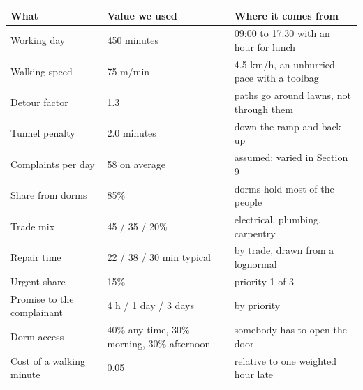 \begin{tabular}{llp{58mm}}
\toprule
\textbf{What} & \textbf{Value we used} & \textbf{Where it comes from} \\
\midrule
Working day & 450 minutes & 09:00 to 17:30 with an hour for lunch \\
Walking speed & 75 m/min & 4.5 km/h, an unhurried pace with a toolbag \\
Detour factor & 1.3 & paths go around lawns, not through them \\
Tunnel penalty & 2.0 minutes & down the ramp and back up \\
Complaints per day & 58 on average & assumed; varied in Section 9 \\
Share from dorms & 85\% & dorms hold most of the people \\
Trade mix & 45 / 35 / 20\% & electrical, plumbing, carpentry \\
Repair time & 22 / 38 / 30 min typical & by trade, drawn from a lognormal \\
Urgent share & 15\% & priority 1 of 3 \\
Promise to the complainant & 4 h / 1 day / 3 days & by priority \\
Dorm access & 40\% any time, 30\% morning, 30\% afternoon & somebody has to open the door \\
Cost of a walking minute & 0.05 & relative to one weighted hour late \\
\bottomrule
\end{tabular}
